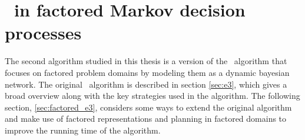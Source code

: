 \section{\etre\ in factored Markov decision processes}
\label{sec:fac_e3}

The second algorithm studied in this thesis is a version of the \etre\
algorithm that focuses on factored problem domains by modeling them as a
dynamic bayesian network. The original \etre\ algorithm is described in section
\ref{sec:e3}, which gives a broad overview along with the key strategies used
in the algorithm. The following section, \ref{sec:factored_e3}, considers some
ways to extend the original algorithm and make use of factored representations
and planning in factored domains to improve the running time of the algorithm.



